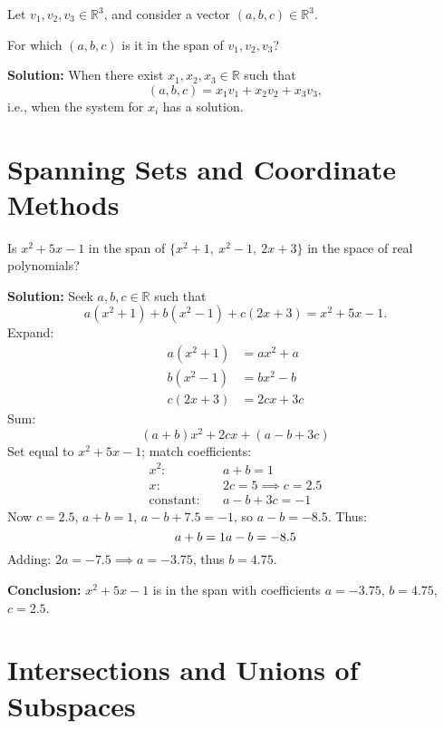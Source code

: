 \documentclass[11pt,a4paper]{article}
\theoremstyle{definition}
\theoremstyle{plain}
\theoremstyle{remark}
\begin{document}
\begin{original_example}[title=Span in $\mathbb{R}^3$]
Let $v_1, v_2, v_3 \in \mathbb{R}^3$, and consider a vector $(a, b, c) \in \mathbb{R}^3$. 

For which $(a,b,c)$ is it in the span of $v_1, v_2, v_3$?

\textbf{Solution:} When there exist $x_1, x_2, x_3 \in \mathbb{R}$ such that
\[
    (a, b, c) = x_1 v_1 + x_2 v_2 + x_3 v_3,
\]
i.e., when the system for $x_i$ has a solution.
\end{original_example}

\section{Spanning Sets and Coordinate Methods}

\begin{original_example}[title=Span of Polynomials]
Is $x^2 + 5x - 1$ in the span of $\{x^2 + 1,\ x^2 - 1,\ 2x + 3\}$ in the space of real polynomials?

\textbf{Solution:}
Seek $a, b, c \in \mathbb{R}$ such that
\[
a(x^2 + 1) + b(x^2 - 1) + c(2x + 3) = x^2 + 5x - 1.
\]
Expand:
\begin{align*}
    a(x^2 + 1) &= a x^2 + a \\
    b(x^2 - 1) &= b x^2 - b \\
    c(2x + 3) &= 2c x + 3c
\end{align*}
Sum:
\[
(a + b) x^2 + 2c x + (a - b + 3c)
\]
Set equal to $x^2 + 5x - 1$; match coefficients:
\begin{align*}
    \text{$x^2$:} &\quad a + b = 1 \\
    \text{$x$:} &\quad 2c = 5 \implies c = 2.5 \\
    \text{constant:} &\quad a - b + 3c = -1
\end{align*}
Now $c = 2.5$, $a + b = 1$, $a - b + 7.5 = -1$, so $a - b = -8.5$. Thus:
\[
a + b = 1 \\
a - b = -8.5
\]
Adding: $2a = -7.5 \implies a = -3.75$, thus $b = 4.75$.

\textbf{Conclusion:} $x^2 + 5x - 1$ is in the span with coefficients $a = -3.75$, $b = 4.75$, $c = 2.5$.
\end{original_example}

\section{Intersections and Unions of Subspaces}
\end{document}
